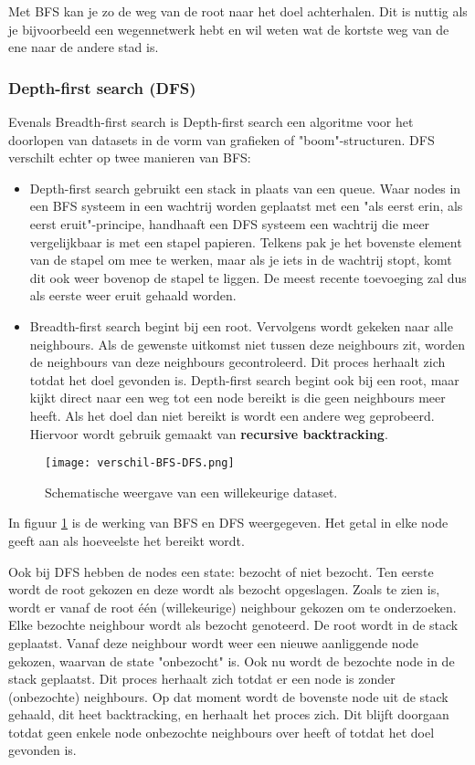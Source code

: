 Met BFS kan je zo de weg van de root naar het doel achterhalen. Dit is nuttig als je bijvoorbeeld een wegennetwerk hebt en wil weten wat de kortste weg van de ene naar de andere stad is.

\subsubsection{Depth-first search (DFS)}
Evenals Breadth-first search is Depth-first search een algoritme voor het doorlopen van datasets in de vorm van grafieken of "boom"-structuren. DFS verschilt echter op twee manieren van BFS:

\begin{itemize}
\item Depth-first search gebruikt een stack in plaats van een queue. Waar nodes in een BFS systeem in een wachtrij worden geplaatst met een "als eerst erin, als eerst eruit"-principe, handhaaft een DFS systeem een wachtrij die meer vergelijkbaar is met een stapel papieren. Telkens pak je het bovenste element van de stapel om mee te werken, maar als je iets in de wachtrij stopt, komt dit ook weer bovenop de stapel te liggen. De meest recente toevoeging zal dus als eerste weer eruit gehaald worden.
\item Breadth-first search begint bij een root. Vervolgens wordt gekeken naar alle neighbours. Als de gewenste uitkomst niet tussen deze neighbours zit, worden de neighbours van deze neighbours gecontroleerd. Dit proces herhaalt zich totdat het doel gevonden is.
Depth-first search begint ook bij een root, maar kijkt direct naar een weg tot een node bereikt is die geen neighbours meer heeft. Als het doel dan niet bereikt is wordt een andere weg geprobeerd. Hiervoor wordt gebruik gemaakt van \textbf{recursive backtracking}.

\end{itemize}

\begin{figure}[H]
  \centering
    \texttt{[image: verschil-BFS-DFS.png]}
  \caption{Schematische weergave van een willekeurige dataset.}
  \label{fig:verschil-BFS-DFS}
\end{figure}

In figuur \ref{fig:verschil-BFS-DFS} is de werking van BFS en DFS weergegeven. Het getal in elke node geeft aan als hoeveelste het bereikt wordt. 

Ook bij DFS hebben de nodes een state: bezocht of niet bezocht.
Ten eerste wordt de root gekozen en deze wordt als bezocht opgeslagen. Zoals te zien is, wordt er vanaf de root \'e\'en (willekeurige) neighbour gekozen om te onderzoeken. Elke bezochte neighbour wordt als bezocht genoteerd. De root wordt in de stack geplaatst. Vanaf deze neighbour wordt weer een nieuwe aanliggende node gekozen, waarvan de state "onbezocht" is. Ook nu wordt de bezochte node in de stack geplaatst. Dit proces herhaalt zich totdat er een node is zonder (onbezochte) neighbours. Op dat moment wordt de bovenste node uit de stack gehaald, dit heet backtracking, en herhaalt het proces zich. Dit blijft doorgaan totdat geen enkele node onbezochte neighbours over heeft of totdat het doel gevonden is.

